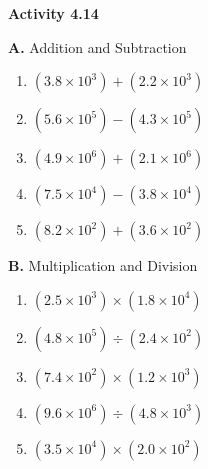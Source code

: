 \vspace{0.3ex}
\noindent\textbf{Activity 4.14}

\vspace{0.2ex}

\begin{multicols}{2}
\noindent\textbf{A.} Addition and Subtraction
\begin{enumerate}
    \item \( (3.8 \times 10^3) + (2.2 \times 10^3) \)  
    \item \( (5.6 \times 10^5) - (4.3 \times 10^5) \)  
    \item \( (4.9 \times 10^6) + (2.1 \times 10^6) \)  
    \item \( (7.5 \times 10^4) - (3.8 \times 10^4) \)  
    \item \( (8.2 \times 10^2) + (3.6 \times 10^2) \)  
\end{enumerate}

\noindent\textbf{B.} Multiplication and Division
\begin{enumerate}
    \item \( (2.5 \times 10^3) \times (1.8 \times 10^4) \)  
    \item \( (4.8 \times 10^5) \div (2.4 \times 10^2) \)  
    \item \( (7.4 \times 10^2) \times (1.2 \times 10^3) \)  
    \item \( (9.6 \times 10^6) \div (4.8 \times 10^3) \)  
    \item \( (3.5 \times 10^4) \times (2.0 \times 10^2) \)  
\end{enumerate}
\end{multicols}
